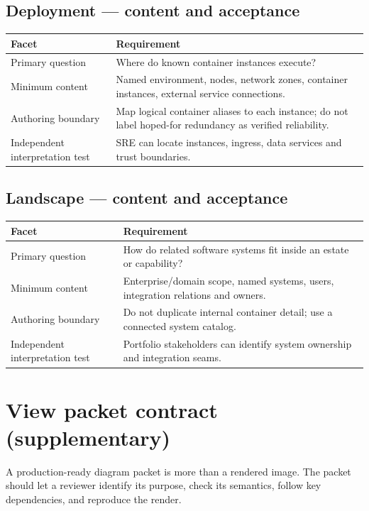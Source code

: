 \documentclass[10pt,letterpaper]{article}
\begin{document}
\subsection{Deployment — content and acceptance}
\begin{tabularx}{\linewidth}{@{}YY@{}}\toprule
\textbf{Facet} & \textbf{Requirement} \\ \midrule
Primary question & Where do known container instances execute? \\
Minimum content & Named environment, nodes, network zones, container instances, external service connections. \\
Authoring boundary & Map logical container aliases to each instance; do not label hoped-for redundancy as verified reliability. \\
Independent interpretation test & SRE can locate instances, ingress, data services and trust boundaries. \\
\bottomrule\end{tabularx}

\subsection{Landscape — content and acceptance}
\begin{tabularx}{\linewidth}{@{}YY@{}}\toprule
\textbf{Facet} & \textbf{Requirement} \\ \midrule
Primary question & How do related software systems fit inside an estate or capability? \\
Minimum content & Enterprise/domain scope, named systems, users, integration relations and owners. \\
Authoring boundary & Do not duplicate internal container detail; use a connected system catalog. \\
Independent interpretation test & Portfolio stakeholders can identify system ownership and integration seams. \\
\bottomrule\end{tabularx}

\section{View packet contract (supplementary)}
A production-ready diagram packet is more than a rendered image. The packet should let a reviewer identify its purpose, check its semantics, follow key dependencies, and reproduce the render.
\end{document}
